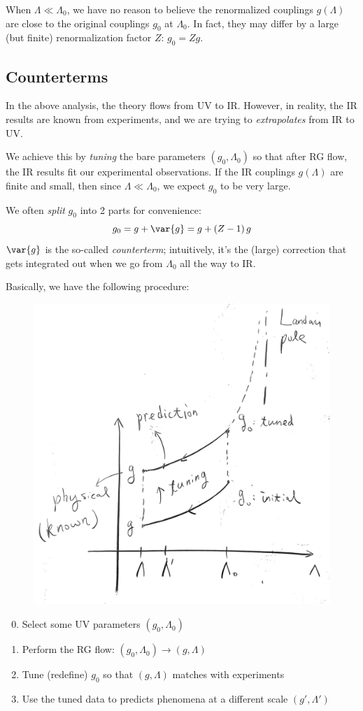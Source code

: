 \documentclass[a4paper,10pt]{article}
\begin{document}
	When $\Lambda \ll \Lambda_0$, we have no reason to believe the
	renormalized couplings $g(\Lambda)$ are close to the original
	couplings $g_0$ at $\Lambda_0$. In fact, they may differ by a large
	(but finite) renormalization factor $Z$: $g_0 = Zg$.
	
\subsection{Counterterms}
	In the above analysis, the theory flows from UV to IR. However, in
	reality, the IR results are known from experiments, and we are trying to
	\emph{extrapolates} from IR to UV.
	
	We achieve this by \emph{tuning} the bare parameters $(g_0,\Lambda_0)$
	so that after RG flow, the IR results fit our experimental observations.
	If the IR couplings $g(\Lambda)$ are finite and small, then since
	$\Lambda \ll \Lambda_0$, we expect $g_0$ to be very large.
	
	We often \emph{split} $g_0$ into 2 parts for convenience:
	\begin{equation}
	  g_0 = g + \var{g}
	  = g + (Z - 1)\,g
	\end{equation}
	$\var{g}$ is the so-called \emph{counterterm}; intuitively, it's the
	(large) correction that gets integrated out when we go from
	$\Lambda_0$ all the way to IR.
	
	Basically, we have the following procedure:
	
	\begin{figure}[!h]
	\centering
	\includegraphics[width=.5\linewidth]{img/RG-process.png}
	\end{figure}
	
	\begin{enumerate}[noitemsep,midpenalty=100]
	\setcounter{enumi}{-1}
	
	\item
	  Select some UV parameters $(g_0,\Lambda_0)$
	\item
	  Perform the RG flow: $(g_0,\Lambda_0)\to (g,\Lambda)$
	\item
	  Tune (redefine) $g_0$ so that $(g,\Lambda)$ matches with
	  experiments
	\item
	  Use the tuned data to predicts phenomena at a different scale
	  $(g',\Lambda')$
	\end{enumerate}
	
\end{document}
